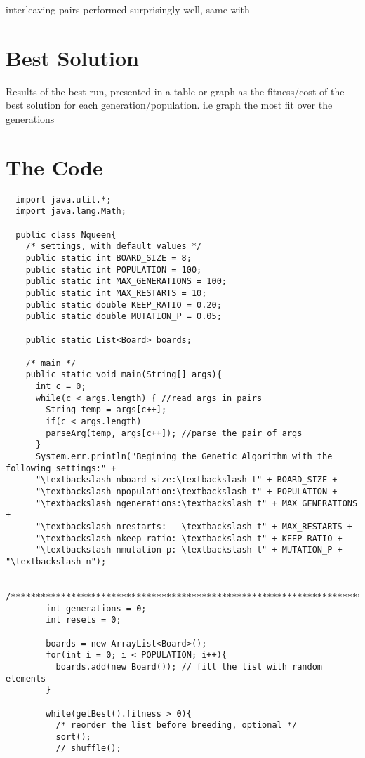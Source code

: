 \documentclass[a4paper,11pt]{article}
\begin{document}
interleaving pairs performed surprisingly well, same with 

\section*{Best Solution}
Results of the best run, presented in a table or graph as the fitness/cost of the best solution for each generation/population.
i.e graph the most fit over the generations

\section*{The Code}
\addtolength{\oddsidemargin}{-.5in}
\addtolength{\evensidemargin}{-.5in}
\begin{lstlisting}
  import java.util.*;
  import java.lang.Math;
  
  public class Nqueen{
    /* settings, with default values */
    public static int BOARD_SIZE = 8;
    public static int POPULATION = 100;
    public static int MAX_GENERATIONS = 100;
    public static int MAX_RESTARTS = 10;
    public static double KEEP_RATIO = 0.20;
    public static double MUTATION_P = 0.05;

    public static List<Board> boards;

    /* main */
    public static void main(String[] args){
      int c = 0;
      while(c < args.length) { //read args in pairs
        String temp = args[c++];
        if(c < args.length)
        parseArg(temp, args[c++]); //parse the pair of args
      }
      System.err.println("Begining the Genetic Algorithm with the following settings:" +
      "\textbackslash nboard size:\textbackslash t" + BOARD_SIZE +
      "\textbackslash npopulation:\textbackslash t" + POPULATION +
      "\textbackslash ngenerations:\textbackslash t" + MAX_GENERATIONS +
      "\textbackslash nrestarts:   \textbackslash t" + MAX_RESTARTS +
      "\textbackslash nkeep ratio: \textbackslash t" + KEEP_RATIO +
      "\textbackslash nmutation p: \textbackslash t" + MUTATION_P + "\textbackslash n");

        /************************************************************************/
        int generations = 0;
        int resets = 0;
        
        boards = new ArrayList<Board>();
        for(int i = 0; i < POPULATION; i++){
          boards.add(new Board()); // fill the list with random elements
        }
        
        while(getBest().fitness > 0){
          /* reorder the list before breeding, optional */
          sort();
          // shuffle();


\end{lstlisting}
\end{document}
